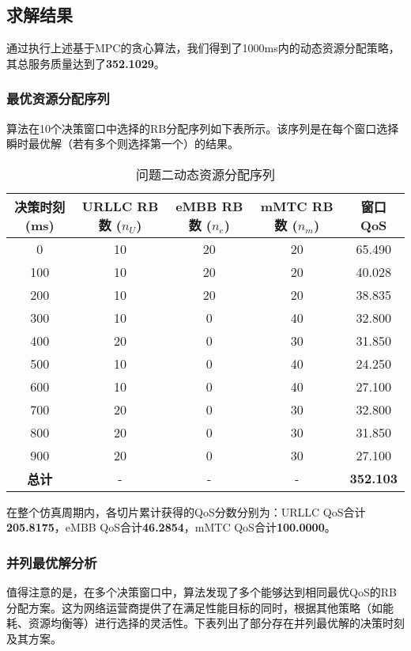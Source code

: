 \subsection{求解结果}

通过执行上述基于MPC的贪心算法，我们得到了1000ms内的动态资源分配策略，其总服务质量达到了\textbf{352.1029}。

\subsubsection{最优资源分配序列}

算法在10个决策窗口中选择的RB分配序列如下表所示。该序列是在每个窗口选择瞬时最优解（若有多个则选择第一个）的结果。

\begin{table}[H]
\centering
\caption{问题二动态资源分配序列}
\label{tab:q2_decision_sequence}
\begin{tabular}{ccccc}
\hline
\textbf{决策时刻 (ms)} & \textbf{URLLC RB数 ($n_U$)} & \textbf{eMBB RB数 ($n_e$)} & \textbf{mMTC RB数 ($n_m$)} & \textbf{窗口QoS} \\
\hline
0 & 10 & 20 & 20 & 65.490 \\
100 & 10 & 20 & 20 & 40.028 \\
200 & 10 & 20 & 20 & 38.835 \\
300 & 10 & 0 & 40 & 32.800 \\
400 & 20 & 0 & 30 & 31.850 \\
500 & 10 & 0 & 40 & 24.250 \\
600 & 10 & 0 & 40 & 27.100 \\
700 & 20 & 0 & 30 & 32.800 \\
800 & 20 & 0 & 30 & 31.850 \\
900 & 20 & 0 & 30 & 27.100 \\
\hline
\textbf{总计} & - & - & - & \textbf{352.103} \\
\hline
\end{tabular}
\end{table}

在整个仿真周期内，各切片累计获得的QoS分数分别为：URLLC QoS合计\textbf{205.8175}，eMBB QoS合计\textbf{46.2854}，mMTC QoS合计\textbf{100.0000}。

\subsubsection{并列最优解分析}

值得注意的是，在多个决策窗口中，算法发现了多个能够达到相同最优QoS的RB分配方案。这为网络运营商提供了在满足性能目标的同时，根据其他策略（如能耗、资源均衡等）进行选择的灵活性。下表列出了部分存在并列最优解的决策时刻及其方案。

